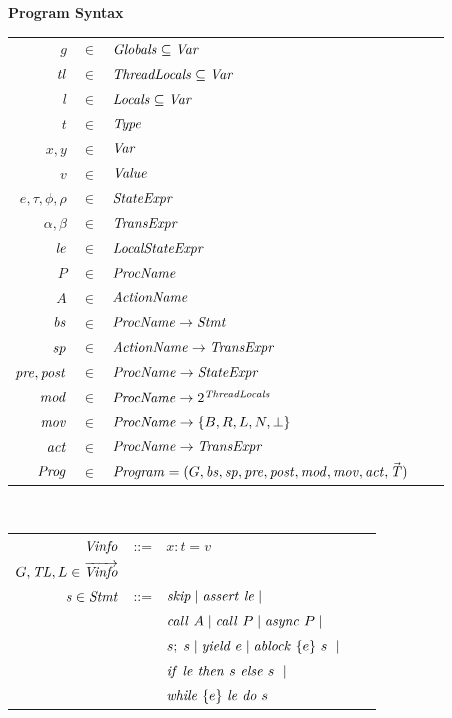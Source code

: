 \begin{figure}
\setlength{\tabcolsep}{3pt}
{\bf Program Syntax} \\
\begin{tabular}{rclcl}
$g$ & $\in$ & $\mathit{Globals} \subseteq \mathit{Var}$ \\
$\mathit{tl}$ & $\in$ & $\mathit{ThreadLocals} \subseteq \mathit{Var}$ \\
$l$ & $\in$ & $\mathit{Locals} \subseteq \mathit{Var}$ \\
$t$ & $\in$ & $\mathit{Type}$ \\
$x,y$ & $\in$ & $\mathit{Var}$ \\
$v$ &  $\in$ & $\mathit{Value}$ \\
$e, \tau, \phi, \rho$ & $\in$ & $\mathit{StateExpr}$ \\
$\alpha, \beta$ & $\in$ & $\mathit{TransExpr}$ \\
$\mathit{le}$ & $\in$ & $\mathit{LocalStateExpr}$ \\
$P$ & $\in$ & $\mathit{ProcName}$ \\
$A$ & $\in$ & $\mathit{ActionName}$ \\
$\mathit{bs}$ & $\in$ & $\mathit{ProcName} \rightarrow \mathit{Stmt}$ \\
$\mathit{sp}$ & $\in$ & $\mathit{ActionName} \rightarrow \mathit{TransExpr}$ \\
$\mathit{pre},\mathit{post}$ & $\in$ & $\mathit{ProcName} \rightarrow \mathit{StateExpr}$ \\
$\mathit{mod}$ & $\in$ & $\mathit{ProcName} \rightarrow 2^{\mathit{ThreadLocals}}$ \\
$\mathit{mov}$ & $\in$ & $\mathit{ProcName} \rightarrow \{B,R,L,N,\perp\}$ \\
$\mathit{act}$ & $\in$ & $\mathit{ProcName} \rightarrow \mathit{TransExpr}$ \\
$\mathit{Prog}$ & $\in$ & $\mathit{Program} = (G, \mathit{bs}, \mathit{sp}, \mathit{pre}, \mathit{post}, \mathit{mod}, \mathit{mov}, \mathit{act}, \vec{\mathit{T}})$ \\
\end{tabular}
~\\
\begin{tabular}{rclcl}
$\mathit{Vinfo}$ &::= & $x:t=v$ \\
$G,\mathit{TL},L \in \overrightarrow{\mathit{Vinfo}}$ \\
$\mathit{s} \in \mathit{Stmt}$ &::= & $\mathit{skip} \mid \mathit{assert}\ \mathit{le} \mid $ \\
                  & & $\mathit{call}\ A \mid \mathit{call}\ P \mid \mathit{async}\ P \mid $\\
                  & & $s;\;s \mid \mathit{yield}\ e \mid \mathit{ablock}\ {\{e\}}\ {s}\  \mid$\\
                 & & ${\mathit{if}\ {\mathit{le}}\ }{\mathit{then}\ {s}\ }{\mathit{else}\ {s}\ } \mid$ \\
                  & & $\mathit{while}\ \{{e}\}\ {{\mathit{le}}\ } \mathit{do}\ {{s}\ }$ \\ 

\end{tabular}
\end{figure}
